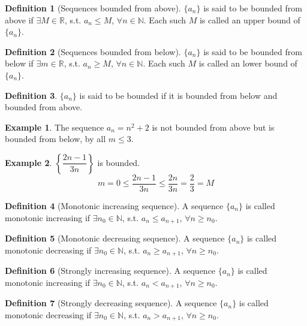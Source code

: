 \documentclass[fleqn, a4paper, 12pt, twoside]{article}
\theoremstyle{definition}
\newtheorem{example}{Example}
\newtheorem{definition}{Definition}
\theoremstyle{theorem}
\begin{document}
{\begin{definition}[Sequences bounded from above]
	$\{a_n\}$ is said to be bounded from above if $\exists M \in \mathbb{R}$, s.t. $a_n \leq M$, $\forall n \in \mathbb{N}$.
	Each such $M$ is called an upper bound of $\{a_n\}$.
\end{definition}

\begin{definition}[Sequences bounded from below]
	$\{a_n\}$ is said to be bounded from below if $\exists m \in \mathbb{R}$, s.t. $a_n \geq M$, $\forall n \in \mathbb{N}$.
	Each such $M$ is called an lower bound of $\{a_n\}$.
\end{definition}

\begin{definition}
	$\{a_n\}$ is said to be bounded if it is bounded from below and bounded from above.
\end{definition}

\begin{example}
	The sequence $a_n = n^2 + 2$ is not bounded from above but is bounded from below, by all $m \leq 3$.
\end{example}

\begin{example}
	$\left\{ \dfrac{2n - 1}{3n} \right\}$ is bounded.
	\begin{equation*}
		m = 0 \leq \dfrac{2n - 1}{3n} \leq \dfrac{2n}{3n} = \dfrac{2}{3} = M
	\end{equation*}
\end{example}

\begin{definition}[Monotonic increasing sequence]
	A sequence $\{a_n\}$ is called monotonic increasing if $\exists n_0 \in \mathbb{N}$, s.t. $a_n \leq a_{n + 1}$, $\forall n \geq n_0$.
\end{definition}

\begin{definition}[Monotonic decreasing sequence]
	A sequence $\{a_n\}$ is called monotonic decreasing if $\exists n_0 \in \mathbb{N}$, s.t. $a_n \geq a_{n + 1}$, $\forall n \geq n_0$.
\end{definition}

\begin{definition}[Strongly increasing sequence]
	A sequence $\{a_n\}$ is called monotonic increasing if $\exists n_0 \in \mathbb{N}$, s.t. $a_n < a_{n + 1}$, $\forall n \geq n_0$.
\end{definition}

\begin{definition}[Strongly decreasing sequence]
	A sequence $\{a_n\}$ is called monotonic decreasing if $\exists n_0 \in \mathbb{N}$, s.t. $a_n > a_{n + 1}$, $\forall n \geq n_0$.
\end{definition}

}
\end{document}

